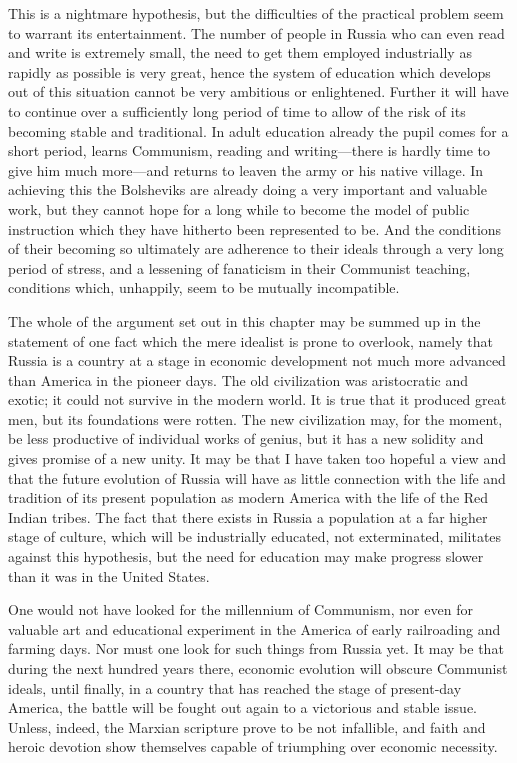 This is a nightmare hypothesis, but the difficulties of the practical problem seem to warrant its entertainment. The number of people in Russia who can even read and write is extremely small, the need to get them employed industrially as rapidly as possible is very great, hence the system of education which develops out of this situation cannot be very ambitious or enlightened. Further it will have to continue over a sufficiently long period of time to allow of the risk of its becoming stable and traditional. In adult education already the pupil comes for a short period, learns Communism, reading and writing---there is hardly time to give him much more---and returns to leaven the army or his native village. In achieving this the Bolsheviks are already doing a very important and valuable work, but they cannot hope for a long while to become the model of public instruction which they have hitherto been represented to be. And the conditions of their becoming so ultimately are adherence to their ideals through a very long period of stress, and a lessening of fanaticism in their Communist teaching, conditions which, unhappily, seem to be mutually incompatible.

The whole of the argument set out in this chapter may be summed up in the statement of one fact which the mere idealist is prone to overlook, namely that Russia is a country at a stage in economic development not much more advanced than America in the pioneer days. The old civilization was aristocratic and exotic; it could not survive in the modern world. It is true that it produced great men, but its foundations were rotten. The new civilization may, for the moment, be less productive of individual works of genius, but it has a new solidity and gives promise of a new unity. It may be that I have taken too hopeful a view and that the future evolution of Russia will have as little connection with the life and tradition of its present population as modern America with the life of the Red Indian tribes. The fact that there exists in Russia a population at a far higher stage of culture, which will be industrially educated, not exterminated, militates against this hypothesis, but the need for education may make progress slower than it was in the United States.

One would not have looked for the millennium of Communism, nor even for valuable art and educational experiment in the America of early railroading and farming days. Nor must one look for such things from Russia yet. It may be that during the next hundred years there, economic evolution will obscure Communist ideals, until finally, in a country that has reached the stage of present-day America, the battle will be fought out again to a victorious and stable issue. Unless, indeed, the Marxian scripture prove to be not infallible, and faith and heroic devotion show themselves capable of triumphing over economic necessity.